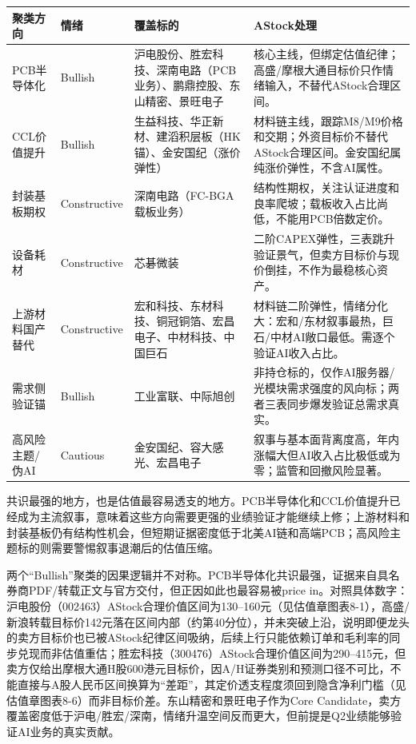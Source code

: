 \begin{exhibitbox}
\small
\begin{tabularx}{\textwidth}{L{2.2cm}C{1.5cm}X X}
\toprule
\textbf{聚类方向} & \textbf{情绪} & \textbf{覆盖标的} & \textbf{AStock处理} \\
\midrule
PCB半导体化 & Bullish & 沪电股份、胜宏科技、深南电路（PCB业务）、鹏鼎控股、东山精密、景旺电子 & 核心主线，但绑定估值纪律；高盛/摩根大通目标价只作情绪输入，不替代AStock合理区间。 \\
\midrule
CCL价值提升 & Bullish & 生益科技、华正新材、建滔积层板（HK锚）、金安国纪（涨价弹性） & 材料链主线，跟踪M8/M9价格和交期；外资目标价不替代AStock合理区间。金安国纪属纯涨价弹性，不含AI属性。 \\
\midrule
封装基板期权 & Constructive & 深南电路（FC-BGA载板业务） & 结构性期权，关注认证进度和良率爬坡；载板收入占比尚低，不能用PCB倍数定价。 \\
\midrule
设备耗材 & Constructive & 芯碁微装 & 二阶CAPEX弹性，三表跳升验证景气，但卖方目标价与现价倒挂，不作为最稳核心资产。 \\
\midrule
上游材料国产替代 & Constructive & 宏和科技、东材科技、铜冠铜箔、宏昌电子、中材科技、中国巨石 & 材料链二阶弹性，情绪分化大：宏和/东材叙事最热，巨石/中材AI敞口最低。需逐个验证AI收入占比。 \\
\midrule
需求侧验证锚 & Bullish & 工业富联、中际旭创 & 非持仓标的，仅作AI服务器/光模块需求强度的风向标；两者三表同步爆发验证总需求真实。 \\
\midrule
高风险主题/伪AI & Cautious & 金安国纪、容大感光、宏昌电子 & 叙事与基本面背离度高，年内涨幅大但AI收入占比极低或为零；监管和回撤风险显著。 \\
\bottomrule
\end{tabularx}
\end{exhibitbox}

共识最强的地方，也是估值最容易透支的地方。PCB半导体化和CCL价值提升已经成为主流叙事，意味着这些方向需要更强的业绩验证才能继续上修；上游材料和封装基板仍有结构性机会，但短期证据密度低于北美AI链和高端PCB；高风险主题标的则需要警惕叙事退潮后的估值压缩。

两个``Bullish''聚类的因果逻辑并不对称。PCB半导体化共识最强，证据来自具名券商PDF/转载正文与官方交付，但正因如此也最容易被price in。对照具体数字：沪电股份（002463）AStock合理价值区间为130--160元（见估值章图表8-1），高盛/新浪转载目标价142元落在区间内部（约第40分位），并未突破上沿，说明即便龙头的卖方目标价也已被AStock纪律区间吸纳，后续上行只能依赖订单和毛利率的同步兑现而非估值重估；胜宏科技（300476）AStock合理价值区间为290--415元，但卖方仅给出摩根大通H股600港元目标价，因A/H证券类别和预测口径不可比，不能直接与A股人民币区间换算为``差距''，其定价透支程度须回到隐含净利门槛（见估值章图表8-6）而非目标价差。东山精密和景旺电子作为Core Candidate，卖方覆盖密度低于沪电/胜宏/深南，情绪升温空间反而更大，但前提是Q2业绩能够验证AI业务的真实贡献。


